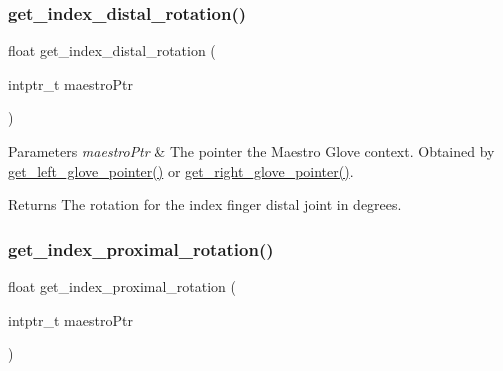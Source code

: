 \subsubsection{\texorpdfstring{get\+\_\+index\+\_\+distal\+\_\+rotation()}{get\_index\_distal\_rotation()}}
{\footnotesize\ttfamily float get\+\_\+index\+\_\+distal\+\_\+rotation (\begin{DoxyParamCaption}\item[{intptr\+\_\+t}]{maestro\+Ptr }\end{DoxyParamCaption})}


\begin{DoxyParams}{Parameters}
{\em maestro\+Ptr} & The pointer the Maestro Glove context. Obtained by \hyperlink{group__glove_management_ga63ce3c99d4a8b8db851b22af9185764e}{get\+\_\+left\+\_\+glove\+\_\+pointer()} or \hyperlink{group__glove_management_ga9b8fd9d91aeac3f8da50f7a7eba0c32b}{get\+\_\+right\+\_\+glove\+\_\+pointer()}. \\
\hline
\end{DoxyParams}
\begin{DoxyReturn}{Returns}
The rotation for the index finger distal joint in degrees. 
\end{DoxyReturn}
\mbox{\label{group__rotation_access_ga7d2da9a343911275b4343c2904c0f92a}} 
\subsubsection{\texorpdfstring{get\+\_\+index\+\_\+proximal\+\_\+rotation()}{get\_index\_proximal\_rotation()}}
{\footnotesize\ttfamily float get\+\_\+index\+\_\+proximal\+\_\+rotation (\begin{DoxyParamCaption}\item[{intptr\+\_\+t}]{maestro\+Ptr }\end{DoxyParamCaption})}


